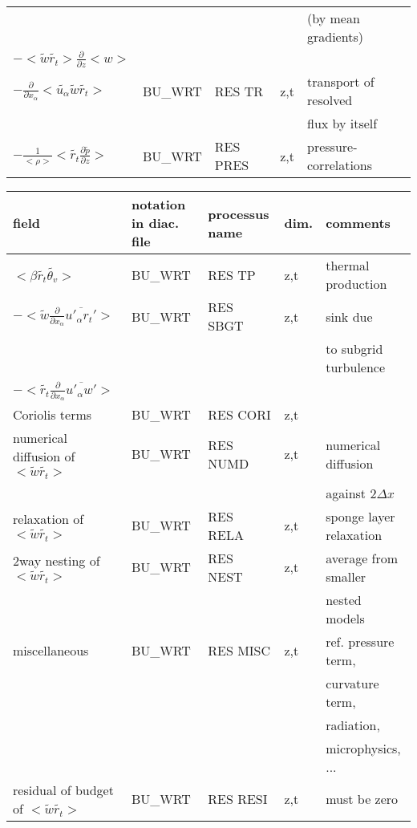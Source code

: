 \begin{center}
\begin{tabular}{||p{5cm}|>{\centering}p{2cm}|>{\centering}p{2.5cm}|>{\centering}p{0.5cm}|p{5.5cm }||}
 & & & &(by mean gradients) \\
$-<\tilde{w}\tilde{r_t}>\frac{\partial }{\partial z}<w>$ &  &  & & \\
\hline
$-\frac{\partial}{\partial x_\alpha} <\tilde{u_\alpha} \tilde{w}\tilde{r_t}>$ & BU\_WRT & RES TR   & z,t & transport of resolved\\
 & & & &flux by itself \\
\hline
$- \frac{1}{<\rho>}<\tilde{r_t} \frac{\partial \tilde{p}}{\partial z}>$ & BU\_WRT & RES PRES & z,t & pressure-correlations \\
\hline
\hline
\end{tabular}
\end{center}

\begin{center}
\begin{tabular}{||p{5cm}|>{\centering}p{2cm}|>{\centering}p{2.5cm}|>{\centering}p{0.5cm}|p{5.5cm }||}
\hline
\hline
field & notation in diac. file & processus name& dim.  & comments \\
\hline
\hline
$ <\beta  \tilde{r_t}\tilde{\theta_v}> $  & BU\_WRT & RES TP   & z,t & thermal production \\
\hline
$- <\tilde{w}\frac{\partial}{\partial x_\alpha}\overline{u'_\alpha r_t'}>$
& BU\_WRT & RES SBGT & z,t & sink due \\
 & & & &to subgrid turbulence \\
$- <\tilde{r_t}\frac{\partial}{\partial x_\alpha}\overline{u'_\alpha w'}>$
&&&&\\
\hline
{\rm Coriolis terms} & BU\_WRT & RES CORI & z,t & \\
\hline
{\rm numerical diffusion of } $<\tilde{w}\tilde{r_t}>$& BU\_WRT & RES NUMD & z,t & numerical diffusion\\
 & & & &against $2\Delta x$ \\
\hline
{\rm relaxation of }$<\tilde{w}\tilde{r_t}>$ & BU\_WRT & RES RELA & z,t& sponge layer relaxation \\
\hline
{\rm 2way nesting of }$<\tilde{w}\tilde{r_t}>$ & BU\_WRT & RES NEST & z,t& average from smaller\\
 & & & &nested models \\
\hline
{\rm miscellaneous} & BU\_WRT & RES MISC & z,t & ref. pressure term, \\
 & & & & curvature term, \\
 & & & & radiation, \\
 & & & & microphysics, ... \\
\hline
{\rm residual of budget of} $<\tilde{w}\tilde{r_t}>$ & BU\_WRT & RES RESI & z,t & must be zero \\

\end{tabular}
\end{center}
